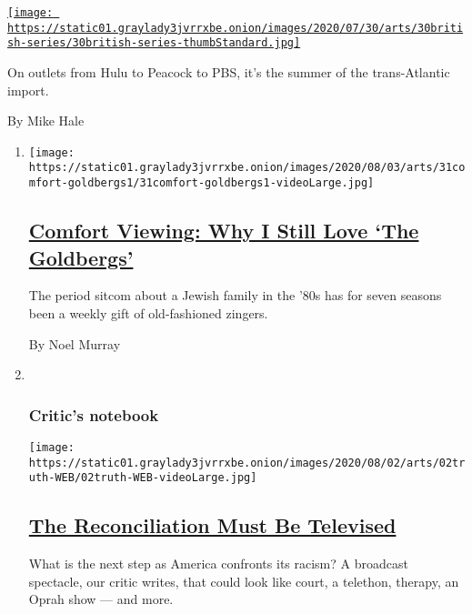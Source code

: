 \begin{enumerate}
\begin{enumerate}
    \href{/2020/07/30/arts/television/in-my-skin-hulu.html}{\texttt{[image: https://static01.graylady3jvrrxbe.onion/images/2020/07/30/arts/30british-series/30british-series-thumbStandard.jpg]}}

    On outlets from Hulu to Peacock to PBS, it's the summer of the
    trans-Atlantic import.

    By Mike Hale
  \end{enumerate}
\end{enumerate}

\begin{enumerate}
\def\labelenumi{\arabic{enumi}.}
\item
  \texttt{[image: https://static01.graylady3jvrrxbe.onion/images/2020/08/03/arts/31comfort-goldbergs1/31comfort-goldbergs1-videoLarge.jpg]}

  \hypertarget{comfort-viewing-why-i-still-love-the-goldbergs}{%
  \subsection{\texorpdfstring{\href{/2020/07/31/arts/television/goldbergs-abc-stream.html}{Comfort
  Viewing: Why I Still Love `The
  Goldbergs'}}{Comfort Viewing: Why I Still Love `The Goldbergs'}}\label{comfort-viewing-why-i-still-love-the-goldbergs}}

  The period sitcom about a Jewish family in the '80s has for seven
  seasons been a weekly gift of old-fashioned zingers.

  By Noel Murray
\item ~
  \hypertarget{critics-notebook-2}{%
  \subsubsection{Critic's notebook}\label{critics-notebook-2}}

  \texttt{[image: https://static01.graylady3jvrrxbe.onion/images/2020/08/02/arts/02truth-WEB/02truth-WEB-videoLarge.jpg]}

  \hypertarget{the-reconciliation-must-be-televised}{%
  \subsection{\texorpdfstring{\href{/2020/07/30/arts/television/the-moment-racism-tv.html}{The
  Reconciliation Must Be
  Televised}}{The Reconciliation Must Be Televised}}\label{the-reconciliation-must-be-televised}}

  What is the next step as America confronts its racism? A broadcast
  spectacle, our critic writes, that could look like court, a telethon,
  therapy, an Oprah show --- and more.


\end{enumerate}
